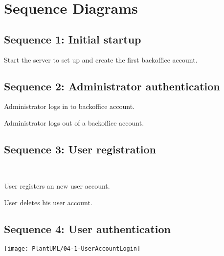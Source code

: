 \chapter{Sequence Diagrams}


\section{Sequence 1: Initial startup}
\resizebox{\linewidth}{!}{}

Start the server to set up and create the first \gls{backoffice account}.


\section{Sequence 2: Administrator authentication}
\resizebox{\linewidth}{!}{}

Administrator logs in to \gls{backoffice account}.
\\[12pt]

\resizebox{\linewidth}{!}{}

Administrator logs out of a \gls{backoffice account}.


\section{Sequence 3: User registration}
\resizebox{\linewidth}{!}{}
\\[12pt]

\resizebox{\linewidth}{!}{}

User registers an new \gls{user account}.

\resizebox{\linewidth}{!}{}

User deletes his \gls{user account}.	

\section{Sequence 4: User authentication}
\texttt{[image: PlantUML/04-1-UserAccountLogin]}

